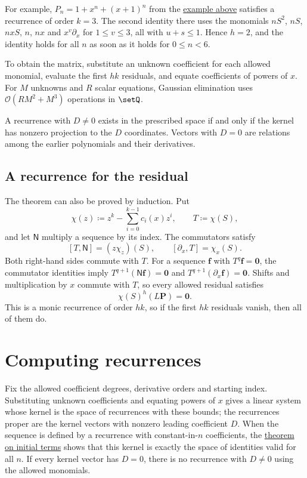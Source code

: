 For example, $P_n=1+x^n+(x+1)^n$ from the
\hyperref[recurrenceTradeoffExample]{example above} satisfies a
recurrence of order $k=3$. The second identity there uses the monomials
$nS^2$, $nS$, $nxS$, $n$, $nx$ and $x^v\partial_x$ for $1\leq v\leq3$, all
with $u+s\leq1$. Hence $h=2$, and the identity holds for all $n$ as soon as
it holds for $0\leq n<6$.

To obtain the matrix, substitute an unknown coefficient for each allowed
monomial, evaluate the first $hk$ residuals, and equate coefficients of
powers of $x$. For $M$ unknowns and $R$ scalar equations, Gaussian elimination
uses $\mathcal{O}(RM^2+M^3)$ operations in $\setQ$.

A recurrence with $D\ne0$ exists in the prescribed space if and only if
the kernel has nonzero projection to the $D$ coordinates. Vectors with
$D=0$ are relations among the earlier polynomials and their derivatives.

\subsection[recurrencePropagation]{A recurrence for the residual}

The theorem can also be proved by induction. Put
\[
 \chi(z)\coloneqq z^k-\sum_{i=0}^{k-1}c_i(x)z^i,\qquad T\coloneqq\chi(S),
\]
and let $\mathsf N$ multiply a sequence by its index. The commutators satisfy
\[
 [T,\mathsf N]=(z\chi_z)(S),\qquad
 [\partial_x,T]=\chi_x(S).
\]
Both right-hand sides commute with $T$. For a sequence $\mathbf{f}$ with
$T^q\mathbf{f}=\mathbf{0}$, the commutator identities imply
$T^{q+1}(\mathsf N\mathbf{f})=\mathbf{0}$ and
$T^{q+1}(\partial_x\mathbf{f})=\mathbf{0}$.
Shifts and multiplication by $x$ commute with $T$, so every allowed residual
satisfies
\[
 \chi(S)^h(L\mathbf{P})=\mathbf{0}.
\]
This is a monic recurrence of order $hk$, so if the first $hk$ residuals
vanish, then all of them do.

\section[recurrenceComputation]{Computing recurrences}

Fix the allowed coefficient degrees, derivative orders and starting index.
Substituting unknown coefficients and equating powers of $x$ gives a linear
system whose kernel is the space of recurrences with these bounds; the
recurrences proper are the kernel vectors with nonzero leading coefficient
$D$. When the sequence is defined by a recurrence with constant-in-$n$
coefficients, the
\hyperref[recurrenceFiniteVerification]{theorem on initial terms}
shows that this kernel is exactly the space of identities valid for all
$n$. If every kernel vector has $D=0$, there is no recurrence with $D\ne0$
using the allowed monomials.

